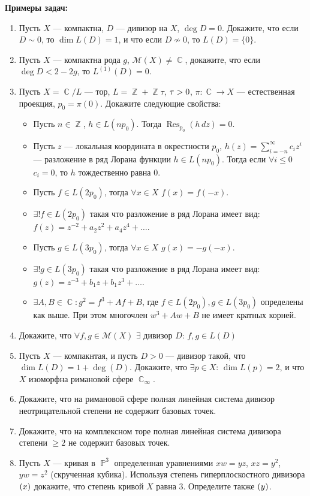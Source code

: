\documentclass[a4paper, 12pt]{article}
\DeclareMathOperator{\ZZ}{\mathbb{Z}}
\DeclareMathOperator{\CC}{\mathbb{C}}
\DeclareMathOperator{\PP}{\mathbb{P}}
\let\Im\relax
\DeclareMathOperator{\Im}{Im}
\DeclareMathOperator{\Res}{Res}
\let\div\relax
\DeclareMathOperator{\div}{div}
\begin{document}
{\bf Примеры задач:}
\begin{enumerate}[noitemsep,topsep=0pt]
    \item Пусть $X$ --- компактна, $D$ --- дивизор на $X$, $\deg D = 0$. Докажите, что если $D \sim 0$, то $\dim L(D) = 1$, и что если $D \not\sim 0$, то $L(D) = \{0\}$. %
    \item Пусть $X$ --- компактна рода $g$, $\mathcal{M}(X)\neq \CC$, докажите, что если $\deg D < 2-2g$, то $L^{(1)}(D)=0$. %
    \item Пусть $X=\CC/L$ --- тор, $L=\ZZ+\ZZ \tau$, $\Im \tau >0$, $\pi:\CC\rightarrow X$ --- естественная проекция, $p_0=\pi(0)$. Докажите следующие свойства:
    \begin{itemize}[noitemsep,topsep=0pt]
        \item Пусть $n\in\ZZ$, $h\in L(n p_0)$. Тогда $\Res_{p_0}(h\,dz)=0$.
        \item Пусть $z$ --- локальная координата в окрестности $p_0$, $h(z)=\sum_{i=-n}^\infty c_i z^i$ --- разложение в ряд Лорана функции $h\in L(n p_0)$. Тогда если $\forall i\leqslant 0$ $c_i=0$, то $h$ тождественно равна $0$.
        \item Пусть $f\in L(2 p_0)$, тогда $\forall x \in X$ $f(x)=f(-x)$.
        \item $\exists! f\in L(2 p_0)$ такая что разложение в ряд Лорана имеет вид: $f(z)=z^{-2} + a_2z^2 + a_4 z^4 + \dots$.
        \item Пусть $g\in L(3 p_0)$, тогда $\forall x \in X$ $g(x)=-g(-x)$.
        \item $\exists! g\in L(3 p_0)$ такая что разложение в ряд Лорана имеет вид: $g(z)=z^{-3} + b_1 z + b_1 z^3 + \dots$.
        \item $\exists A,B\in\CC: g^2=f^3+Af+B$, где $f\in L(2 p_0), g\in L(3 p_0)$ определены как выше. При этом многочлен $w^3+A w + B$ не имеет кратных корней.
    \end{itemize}%
    \item Докажите, что $\forall f,g \in \mathcal{M}(X)$ $\exists$ дивизор $D$: $f,g\in L(D)$ %
    \item Пусть $X$ --- компакнтая, и пусть $D>0$ --- дивизор такой, что $\dim L(D)=1+\deg(D)$. Докажите, что $\exists p\in X$: $\dim L(p)=2$, и что $X$ изоморфна римановой сфере $\CC_\infty$. %
    \item Докажите, что на римановой сфере полная линейная система дивизор неотрицательной степени не содержит базовых точек. %
    \item Докажите, что на комплексном торе полная линейная система дивизора степени $\geqslant 2$ не содержит базовых точек. %
    \item Пусть $X$ --- кривая в $\PP^3$ определенная уравнениями $xw=yz$, $xz=y^2$, $yw=z^2$ (скрученная кубика). Используя степень гиперплоскостного дивизора $\div(x)$ докажите, что степень кривой $X$ равна $3$. Определите также $\div (y)$. %
\end{enumerate}
\end{document}
